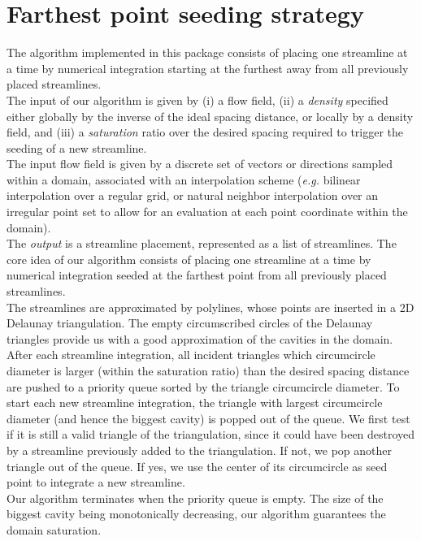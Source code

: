 \section{Farthest point seeding strategy}
\label{Section_2D_Streamlines_Strategy}
The algorithm implemented in this package consists of placing one streamline at
a time by numerical integration starting at the furthest away from all
previously placed streamlines.\\The input of our algorithm is given by
(i) a flow field, (ii) a \textit{density} specified either globally by the
inverse of the ideal spacing distance, or locally by a density field, and (iii)
a \textit{saturation} ratio over the desired spacing required to trigger the
seeding of a new streamline.\\The input flow field is given by a discrete set of
vectors or directions sampled within a domain, associated with an interpolation
scheme (\textit{e.g.} bilinear interpolation over a regular grid, or natural
neighbor interpolation over an irregular point set to
allow for an evaluation at each point coordinate within the domain).\\The
\textit{output} is a streamline placement, represented as a list of streamlines.
The core idea of our algorithm consists of placing one streamline at a time by
numerical integration seeded at the farthest point from all previously placed
streamlines.\\The streamlines are approximated by polylines, whose points are
inserted in a 2D Delaunay triangulation. The empty circumscribed circles of the
Delaunay triangles provide us with a good approximation of the cavities in the
domain.\\After each streamline integration, all incident triangles which
circumcircle diameter is larger (within the saturation ratio) than the desired
spacing distance are pushed to a priority queue sorted by the triangle
circumcircle diameter. To start each new streamline integration, the triangle
with largest circumcircle diameter (and hence the biggest cavity) is popped out
of the queue. We first test if it is still a valid triangle of the
triangulation, since it could have been destroyed by a streamline previously
added to the triangulation. If not, we pop another triangle out of the queue. If
yes, we use the center of its circumcircle as seed point to integrate a new
streamline.\\Our algorithm terminates when the priority queue is empty. The size
of the biggest cavity being monotonically decreasing, our algorithm guarantees
the domain saturation.

